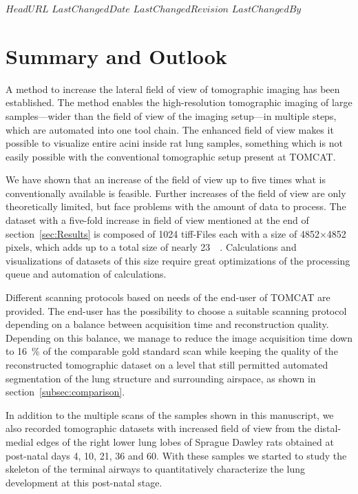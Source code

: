 \svnidlong
{$HeadURL$}
{$LastChangedDate$}
{$LastChangedRevision$}
{$LastChangedBy$}
%
%
\section{Summary and Outlook}\label{summary and outlook}%

A method to increase the lateral field of view of tomographic imaging has been established. The method enables the high-resolution tomographic imaging of large samples---wider than the field of view of the imaging setup---in multiple steps, which are automated into one tool chain. The enhanced field of view makes it possible to visualize entire acini inside rat lung samples, something which is not easily possible with the conventional tomographic setup present at TOMCAT.

We have shown that an increase of the field of view up to five times what is conventionally available is feasible. Further increases of the field of view are only theoretically limited, but face problems with the amount of data to process. The dataset with a five-fold increase in field of view mentioned at the end of section~\ref{sec:Results} is composed of 1024 tiff-Files each with a size of 4852$\times$4852 pixels, which adds up to a total size of nearly \SI{23}{\giga\byte}. Calculations and visualizations of datasets of this size require great optimizations of the processing queue and automation of calculations.

Different scanning protocols based on needs of the end-user of TOMCAT are provided. The end-user has the possibility to choose a suitable scanning protocol depending on a balance between acquisition time and reconstruction quality. Depending on this balance, we manage to reduce the image acquisition time down to \SI{16}{\percent} of the comparable gold standard scan while keeping the quality of the reconstructed tomographic dataset on a level that still permitted automated segmentation of the lung structure and surrounding airspace, as shown in section~\ref{subsec:comparison}.

In addition to the multiple scans of the samples shown in this manuscript, we also recorded tomographic datasets with increased field of view from the distal-medial edges of the right lower lung lobes of Sprague Dawley rats obtained at post-natal days 4, 10, 21, 36 and 60. With these samples we started to study the skeleton of the terminal airways to quantitatively characterize the lung development at this post-natal stage.